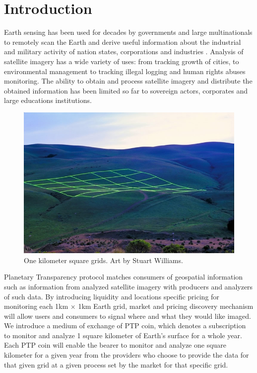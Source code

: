 \documentclass[aps,prl,preprint,groupedaddress]{revtex4}
\begin{document}
\section{Introduction}
Earth sensing has been used for decades by governments and large multinationals to remotely scan the Earth and derive useful information about the industrial and military activity of nation states, corporations and industries \cite{campbell2011introduction}. Analysis of satellite imagery has a wide variety of uses: from tracking growth of cities, to environmental management to tracking illegal logging and human rights abuses monitoring. The ability to obtain and process satellite imagery and distribute the obtained information has been limited so far to sovereign actors, corporates and large educations institutions. \\

\begin{figure}[h]
\includegraphics[width=0.5\linewidth]{earth_grid_01.jpg}
\caption{One kilometer square grids. Art by Stuart Williams.}
\end{figure}
Planetary Transparency protocol matches consumers of geospatial information such as information from analyzed satellite imagery with producers and analyzers of such data. By introducing liquidity and locations specific pricing for monitoring each 1km $\times$ 1km Earth grid, market and pricing discovery mechanism will allow users and consumers to signal where and what they would like imaged. We introduce a medium of exchange \cite{friedman1991island} of PTP coin, which denotes a subscription to monitor and analyze 1 square kilometer of Earth's surface for a whole year. Each PTP coin will enable the bearer to monitor and analyze one square kilometer for a given year from the providers who choose to provide the data for that given grid at a given process set by the market for that specific grid. 
\end{document}
